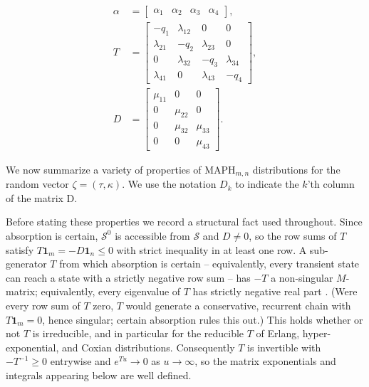 \documentclass{article}
\newcommand{\cs}{\mathcal{S}}
\begin{document}
\begin{figure}[h]
\begin{minipage}[c]{0.38\textwidth}
\centering
\begin{align*}
\alpha &= \begin{bmatrix} \alpha_1 & \alpha_2 & \alpha_3 & \alpha_4 \end{bmatrix},\\[1.5ex]
T &=
\begin{bmatrix}
-q_1 & \lambda_{12} & 0 & 0\\
\lambda_{21} & -q_2 & \lambda_{23} & 0\\
0 & \lambda_{32} & -q_3 & \lambda_{34}\\
\lambda_{41} & 0 & \lambda_{43} & -q_4
\end{bmatrix},\\[1.5ex]
D &=
\begin{bmatrix}
\mu_{11} & 0 & 0\\
0 & \mu_{22} & 0\\
0 & \mu_{32} & \mu_{33}\\
0 & 0 & \mu_{43}
\end{bmatrix}.
\end{align*}
\end{minipage}
\end{figure}

We now summarize a variety of properties of $\text{MAPH}_{m,n}$ distributions for the random vector $\zeta = (
\tau,\kappa)$. We use the notation $D_k$ to indicate the $k$'th column of the matrix D.

Before stating these properties we record a structural fact used throughout. Since absorption is certain, $\cs^0$ is accessible from $\cs$ and $D \neq 0$, so the row sums of $T$ satisfy $T\mathbf{1}_m = -D\mathbf{1}_n \le 0$ with strict inequality in at least one row. A sub-generator $T$ from which absorption is certain -- equivalently, every transient state can reach a state with a strictly negative row sum -- has $-T$ a non-singular $M$-matrix; equivalently, every eigenvalue of $T$ has strictly negative real part \citep[Ch.~6]{berman_plemmons_1994}. (Were every row sum of $T$ zero, $T$ would generate a conservative, recurrent chain with $T\mathbf{1}_m=0$, hence singular; certain absorption rules this out.) This holds whether or not $T$ is irreducible, and in particular for the reducible $T$ of Erlang, hyper-exponential, and Coxian distributions. Consequently $T$ is invertible with $-T^{-1} \ge 0$ entrywise and $e^{Tu} \to 0$ as $u \to \infty$, so the matrix exponentials and integrals appearing below are well defined.
\end{document}
